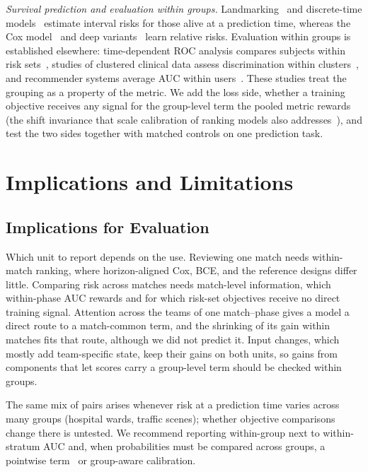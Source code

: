 \documentclass[sigconf,anonymous]{acmart}
\begin{document}
\emph{Survival prediction and evaluation within groups.} Landmarking~\cite{vanHouwelingen07} and discrete-time models~\cite{SingerWillett93,Gensheimer19} estimate interval risks for those alive at a prediction time, whereas the Cox model~\cite{Cox72} and deep variants~\cite{DeepHit18,DynamicDeepHit20} learn relative risks. Evaluation within groups is established elsewhere: time-dependent ROC analysis compares subjects within risk sets~\cite{HeagertyZheng05}, studies of clustered clinical data assess discrimination within clusters~\cite{vanKlaveren14}, and recommender systems average AUC within users~\cite{Zhou18}. These studies treat the grouping as a property of the metric. We add the loss side, whether a training objective receives any signal for the group-level term the pooled metric rewards (the shift invariance that scale calibration of ranking models also addresses~\cite{Yan22}), and test the two sides together with matched controls on one prediction task.

\section{Implications and Limitations}
\label{sec:discussion}
\subsection{Implications for Evaluation}
\label{sec:discussion:implications}
Which unit to report depends on the use. Reviewing one match needs within-match ranking, where horizon-aligned Cox, BCE, and the reference designs differ little. Comparing risk across matches needs match-level information, which within-phase AUC rewards and for which risk-set objectives receive no direct training signal. Attention across the teams of one match--phase gives a model a direct route to a match-common term, and the shrinking of its gain within matches fits that route, although we did not predict it. Input changes, which mostly add team-specific state, keep their gains on both units, so gains from components that let scores carry a group-level term should be checked within groups.

The same mix of pairs arises whenever risk at a prediction time varies across many groups (hospital wards, traffic scenes); whether objective comparisons change there is untested. We recommend reporting within-group next to within-stratum AUC and, when probabilities must be compared across groups, a pointwise term~\cite{Bai23} or group-aware calibration.
\end{document}
